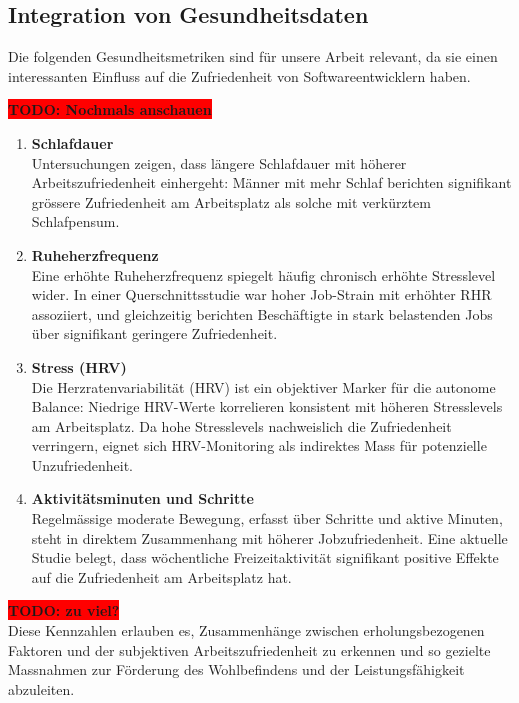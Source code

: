 \documentclass[12pt,a4paper]{report}
\newcommand{\todo}[1]{\colorbox{red}{\textbf{TODO: #1}}\\}
\begin{document}
\subsection{Integration von Gesundheitsdaten}

Die folgenden Gesundheitsmetriken sind für unsere Arbeit relevant, da sie einen interessanten Einfluss
auf die Zufriedenheit von Softwareentwicklern haben.

\todo{Nochmals anschauen}
\begin{enumerate}
  \item \textbf{Schlafdauer}\\
        Untersuchungen zeigen, dass längere Schlafdauer mit höherer Arbeitszufriedenheit einhergeht:
        Männer mit mehr Schlaf berichten signifikant grössere Zufriedenheit am Arbeitsplatz als
        solche mit verkürztem Schlafpensum.

  \item \textbf{Ruheherzfrequenz}\\
        Eine erhöhte Ruheherzfrequenz spiegelt häufig chronisch erhöhte Stresslevel wider. In einer
        Querschnittsstudie war hoher Job-Strain mit erhöhter RHR assoziiert, und gleichzeitig berichten
        Beschäftigte in stark belastenden Jobs über signifikant geringere Zufriedenheit.

  \item \textbf{Stress (HRV)}\\
        Die Herzratenvariabilität (HRV) ist ein objektiver Marker für die autonome Balance: Niedrige
        HRV-Werte korrelieren konsistent mit höheren Stresslevels am Arbeitsplatz. Da hohe Stresslevels
        nachweislich die Zufriedenheit verringern, eignet sich HRV-Monitoring als indirektes Mass für
        potenzielle Unzufriedenheit.

  \item \textbf{Aktivitätsminuten und Schritte}\\
        Regelmässige moderate Bewegung, erfasst über Schritte und aktive Minuten, steht in direktem
        Zusammenhang mit höherer Jobzufriedenheit. Eine aktuelle Studie belegt, dass wöchentliche
        Freizeitaktivität signifikant positive Effekte auf die Zufriedenheit am Arbeitsplatz hat.
\end{enumerate}

\todo{zu viel?}
Diese Kennzahlen erlauben es, Zusammenhänge zwischen erholungsbezogenen Faktoren und der subjektiven
Arbeitszufriedenheit zu erkennen und so gezielte Massnahmen zur Förderung des Wohlbefindens und der
Leistungsfähigkeit abzuleiten.
\end{document}
